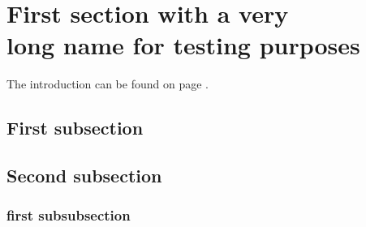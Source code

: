 \lipsum[1]

\section{First section with a very \\long name for testing purposes}
The introduction can be found on page \pageref{sec:introduction}.
\subsection{First subsection}
\lipsum[1-3]

\subsection{Second subsection}
\lipsum[1]

\subsubsection{first subsubsection}
\lipsum[1]